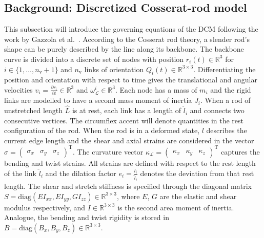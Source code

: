\subsection{Background: Discretized Cosserat-rod model}\label{sub:hsamodel:hsa_robot_simulation:discretized_cosserat_rod_model}
This subsection will introduce the governing equations of the \gls{DCM} following the work by Gazzola et al.~\cite{gazzola2018forward}.
According to the Cosserat rod theory, a slender rod's shape can be purely described by the line along its backbone. %
The backbone curve is divided into a discrete set of nodes with position $r_i(t) \in \mathbb{R}^3$ for $i \in \{1,\dots,n_\mathrm{v}+1\}$ and $n_\mathrm{v}$ links of orientation $Q_i(t) \in \mathbb{R}^{3 \times 3}$.
Differentiating the position and orientation with respect to time gives the translational and angular velocities $v_i = \frac{\partial r_i}{\partial t} \in \mathbb{R}^3$ and $\omega_{\mathcal{L}}^i \in \mathbb{R}^3$.
Each node has a mass of $m_i$ and the rigid links are modelled to have a second mass moment of inertia $J_i$.
When a rod of unstretched length $\hat{L}$ is at rest, each link has a length of $\hat{l}_i$ and connects two consecutive vertices. 
The circumflex accent will denote quantities in the rest configuration of the rod.
When the rod is in a deformed state, $l$ describes the current edge length and
the shear and axial strains are considered in the vector $\sigma = \begin{pmatrix} \sigma_x & \sigma_y & \sigma_z \end{pmatrix}^\mathrm{T}$. The curvature vector $\kappa_{\mathcal{L}} = \begin{pmatrix} \kappa_x & \kappa_y & \kappa_z \end{pmatrix}^\mathrm{T}$ captures the bending and twist strains.
All strains are defined with respect to the rest length of the link $\hat{l}_i$ and the dilation factor $e_i = \frac{l_i}{\hat{l}_i}$ denotes the deviation from that rest length.
The shear and stretch stiffness is specified through the diagonal matrix $S = \mathrm{diag}(E I_{xx}, E I_{yy}, G I_{zz}) \in \mathbb{R}^{3 \times 3}$, where $E$, $G$ are the elastic and shear modulus respectively, and $I \in \mathbb{R}^{3 \times 3}$ is the second area moment of inertia. Analogue, the bending and twist rigidity is stored in $B = \mathrm{diag}(B_x, B_y, B_z) \in \mathbb{R}^{3 \times 3}$.
